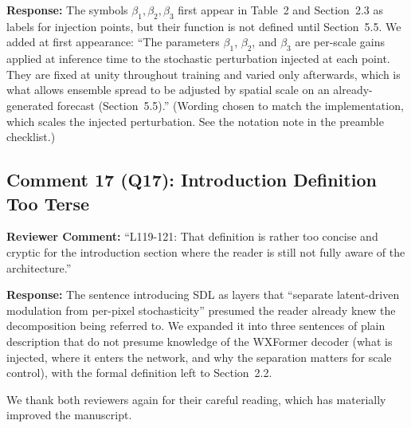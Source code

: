 \documentclass[12pt]{article}
\begin{document}
\textbf{Response:} The symbols $\beta_1,\beta_2,\beta_3$ first appear in
Table~2 and Section~2.3 as labels for injection points, but their function is not
defined until Section~5.5. We added at first appearance: ``The parameters
$\beta_1$, $\beta_2$, and $\beta_3$ are per-scale gains applied at inference time to
the stochastic perturbation injected at each point. They are fixed at unity
throughout training and varied only afterwards, which is what allows ensemble spread
to be adjusted by spatial scale on an already-generated forecast (Section~5.5).''
(Wording chosen to match the implementation, which scales the injected perturbation.
See the notation note in the preamble checklist.)

\subsection*{Comment 17 (Q17): Introduction Definition Too Terse}

\textbf{Reviewer Comment:} ``L119-121: That definition is rather too concise and
cryptic for the introduction section where the reader is still not fully aware of the
architecture.''

\textbf{Response:} The sentence introducing SDL as layers that ``separate
latent-driven modulation from per-pixel stochasticity'' presumed the reader already
knew the decomposition being referred to. We expanded it into three sentences of
plain description that do not presume knowledge of the WXFormer decoder (what is
injected, where it enters the network, and why the separation matters for scale
control), with the formal definition left to Section~2.2.

\vspace{1em}

We thank both reviewers again for their careful reading, which has materially improved
the manuscript.
\end{document}
